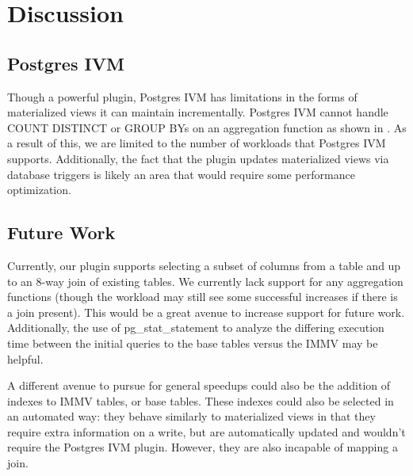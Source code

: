 \section{Discussion}
\subsection{Postgres IVM}
Though a powerful plugin, Postgres IVM has limitations in the forms of materialized views it can maintain incrementally. Postgres IVM cannot handle COUNT DISTINCT or GROUP BYs on an aggregation function as shown in \textcite{pg_ivm}. As a result of this, we are limited to the number of workloads that Postgres IVM supports. Additionally, the fact that the plugin updates materialized views via database triggers is likely an area that would require some performance optimization.

\subsection{Future Work}
Currently, our plugin supports selecting a subset of columns from a table and up to an 8-way join of existing tables. We currently lack support for any aggregation functions (though the workload may still see some successful increases if there is a join present). This would be a great avenue to increase support for future work. Additionally, the use of pg\_stat\_statement to analyze the differing execution time between the initial queries to the base tables versus the IMMV may be helpful.

A different avenue to pursue for general speedups could also be the addition of indexes to IMMV tables, or base tables. These indexes could also be selected in an automated way: they behave similarly to materialized views in that they require extra information on a write, but are automatically updated and wouldn't require the Postgres IVM plugin. However, they are also incapable of mapping a join.


